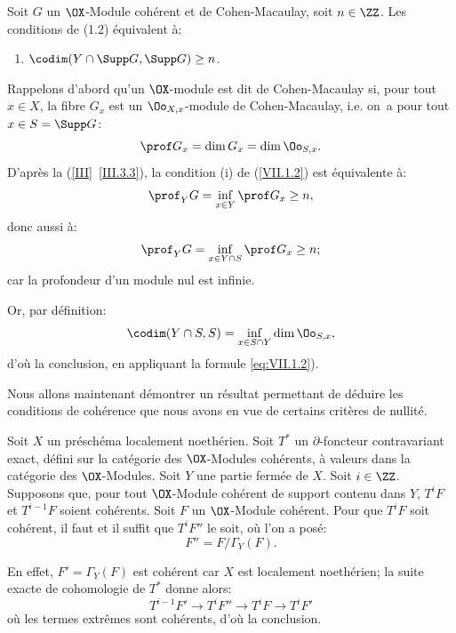 \begin{corollaire}\label{VII.1.4}
Soit $G$ un $\OX$-Module coh\'erent et de Cohen-Macaulay, soit $n \in \ZZ$. Les conditions de \textup{(1.2)} \'equivalent \`a:
\begin{enumerate}
\item[\textup{(v)}]\hfill$\codim(Y \cap \Supp G, \Supp G) \geq n$.\hfill\null
\end{enumerate}
\end{corollaire}
\setcounter{equation}{1}
Rappelons d'abord qu'un $\OX$-module est dit de Cohen-Macaulay si, pour tout $x \in X$, la fibre $G_x$ est un $\Oo_{X, x}$-module de Cohen-Macaulay, i.e. on~a pour tout $x \in S = \Supp G$:
\begin{equation}\label{eq:VII.1.2}
\prof G_x = \dim G_x = \dim \Oo_{S, x}.
\end{equation}
D'apr\`es la (\ref{III}~\ref{III.3.3}), la condition (i) de (\ref{VII.1.2}) est \'equivalente \`a:
\begin{equation}\label{eq:VII.1.3} \prof_Y G = \inf_{x\in Y} \prof G_x \geq n,
\end{equation}
donc aussi \`a:
\[
\prof_Y G = \inf_{x \in Y \cap S} \prof G_x \geq n;
\]
car la profondeur d'un module nul est infinie.

Or, par d\'efinition:
\[
\codim (Y \cap S, S) = \inf_{x \in S \cap Y} \dim \Oo_{S, x},
\]
d'o\`u la conclusion, en appliquant la formule \eqref{eq:VII.1.2}).

Nous allons maintenant d\'emontrer un r\'esultat permettant de d\'eduire les conditions de coh\'erence que nous avons en vue de certains crit\`eres de nullit\'e.

\begin{lemme}\label{VII.1.5}
Soit $X$ un pr\'esch\'ema localement noeth\'erien. Soit $T^{\ast}$ un $\partial$-foncteur contravariant exact, d\'efini sur la cat\'egorie des $\OX$-Modules coh\'erents, \`a valeurs dans la cat\'egorie des $\OX$-Modules. Soit $Y$ une partie ferm\'ee de $X$. Soit $i \in \ZZ$. Supposons que, pour tout $\OX$-Module coh\'erent de support contenu dans $Y$, $T^i F$ et $T^{i-1} F$ soient coh\'erents. Soit $F$ un $\OX$-Module coh\'erent. Pour que $T^i F$ soit coh\'erent, il faut et il suffit que $T^i F''$ le soit, o\`u l'on a pos\'e:
\[
F'' = F / \Gamma_Y (F).
\]
\end{lemme}

En effet, $F' = \Gamma_Y (F)$ est coh\'erent car $X$ est localement noeth\'erien; la suite exacte de cohomologie de $T^{\ast}$ donne alors:
\[
T^{i-1}F' \to T^i F'' \to T^i F \to T^i F'
\]
o\`u les termes extr\^emes sont coh\'erents, d'o\`u la conclusion.


